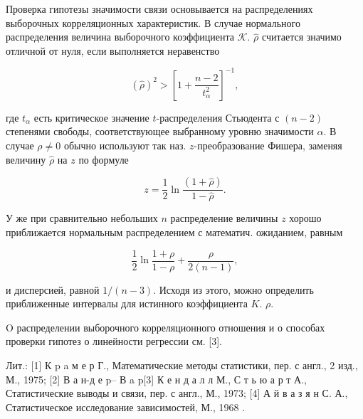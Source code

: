 \documentclass[10pt]{article}
\begin{document}
Проверка гипотезы значимости связи основывается на распределениях выборочных корреляционных характеристик. В случае нормального распределения величина выборочного коэффициента $\mathcal{K}$. $\hat{\rho}$ считается значимо отличной от нуля, если выполняется неравенство



\[

(\hat{\rho})^{2}>\left[1+\frac{n-2}{t_{\alpha}^{2}}\right]^{-1},

\]



где $t_{\alpha}$ есть критическое значение $t$-распределения Стьюдента с $(n-2)$ степенями свободы, соответствующее выбранному уровню значимости $\alpha$. В случае $\rho \neq 0$ обычно используют так наз. $z$-преобразование Фишера, заменяя величину $\hat{\rho}$ на $z$ по формуле



\[

z=\frac{1}{2} \ln \frac{(1+\hat{\rho})}{1-\hat{\rho}} .

\]



У же при сравнительно небольших $n$ распределение величины $z$ хорошо приближается нормальным распределением с математич. ожиданием, равным



\[

\frac{1}{2} \ln \frac{1+\rho}{1-\rho}+\frac{\rho}{2(n-1)},

\]



и дисперсией, равной $1 /(n-3)$. Исходя из этого, можно определить приближенные интервалы для истинного коэффициента $K$. $\rho$.



$\mathrm{O}$ распределении выборочного корреляционного отношения и о способах проверки гипотез о линейности регрессии см. [3].



Лит.: [1] К p a м е р Г., Математические методы статистики, пер. с англ., 2 изд., М., 1975; [2] В а н-д е p-- В a p[3] К е н д а л л М., С т ь ю а р т А., Статистические выводы и связи, пер. с англ., М., 1973; [4] А й в а з я н С. А., Статистическое исследование зависимостей, М., 1968 .
\end{document}
